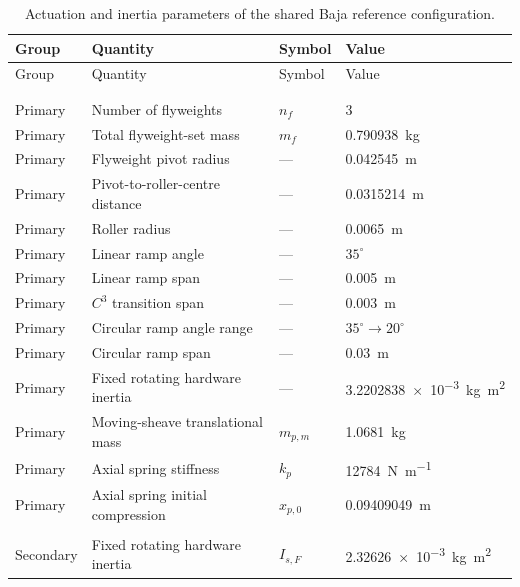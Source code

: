 \documentclass[11pt]{report}
\numberwithin{equation}{section}
\begin{document}
\begin{center}
\small
\setlength{\LTleft}{0pt}
\setlength{\LTright}{0pt}
\begin{longtable}{@{}>{\raggedright\arraybackslash}p{}>{\raggedright\arraybackslash}p{}>{\raggedright\arraybackslash}p{}>{\raggedleft\arraybackslash}p{}@{}}
\toprule
Group & Quantity & Symbol & Value \\ \midrule
\endfirsthead
\toprule
Group & Quantity & Symbol & Value \\ \midrule
\endhead
\bottomrule
\endfoot
\bottomrule
\caption{Actuation and inertia parameters of the shared Baja reference configuration.}
\label{tab:results_common_actuation_inertia}\\
\endlastfoot
\multicolumn{4}{@{}l}{\textbf{Primary}} \\
Primary & Number of flyweights & $n_f$ & $3$ \\[3pt]
Primary & Total flyweight-set mass & $m_f$ & \SI{0.790938}{\kilogram} \\[3pt]
Primary & Flyweight pivot radius & --- & \SI{0.042545}{\meter} \\[3pt]
Primary & Pivot-to-roller-centre distance & --- & \SI{0.0315214}{\meter} \\[3pt]
Primary & Roller radius & --- & \SI{0.0065}{\meter} \\[3pt]
Primary & Linear ramp angle & --- & $35^\circ$ \\[3pt]
Primary & Linear ramp span & --- & \SI{0.005}{\meter} \\[3pt]
Primary & $C^3$ transition span & --- & \SI{0.003}{\meter} \\[3pt]
Primary & Circular ramp angle range & --- & $35^\circ\rightarrow20^\circ$ \\[3pt]
Primary & Circular ramp span & --- & \SI{0.03}{\meter} \\[3pt]
Primary & Fixed rotating hardware inertia & --- & \SI{3.2202838e-3}{\kilogram\meter\squared} \\[3pt]
Primary & Moving-sheave translational mass & $m_{p,m}$ & \SI{1.0681}{\kilogram} \\[3pt]
Primary & Axial spring stiffness & $k_p$ & \SI{12784}{\newton\per\meter} \\[3pt]
Primary & Axial spring initial compression & $x_{p,0}$ & \SI{0.09409049}{\meter} \\[5pt]
\multicolumn{4}{@{}l}{\textbf{Secondary}} \\
Secondary & Fixed rotating hardware inertia & $I_{s,F}$ & \SI{2.32626e-3}{\kilogram\meter\squared} \\[3pt]

\end{longtable}
\end{center}
\end{document}
